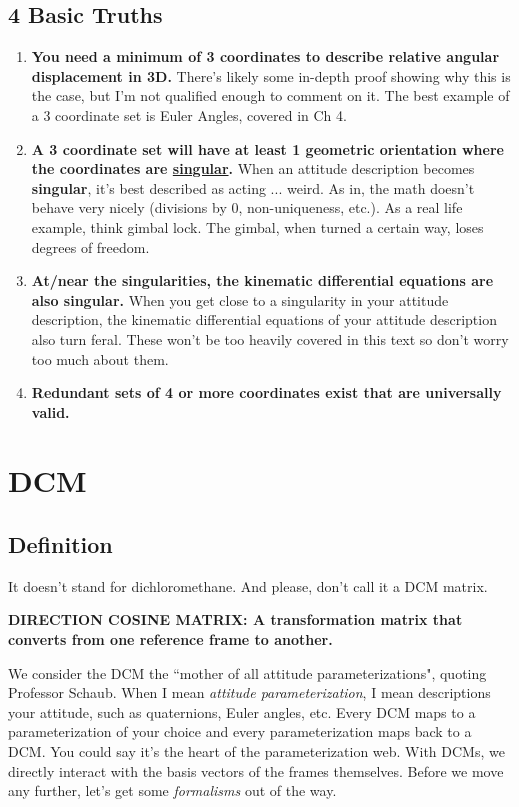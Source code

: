 \documentclass[a4paper,14pt]{extreport}
\begin{document}
\section{4 Basic Truths}
\begin{enumerate}
\item \textbf{You need a minimum of 3 coordinates to describe relative angular displacement in 3D.} There's likely some in-depth proof showing why this is the case, but I'm not qualified enough to comment on it. The best example of a 3 coordinate set is Euler Angles, covered in Ch 4.

\item \textbf{A 3 coordinate set will have at least 1 geometric orientation where the coordinates are \underline{singular}.} When an attitude description becomes \textbf{singular}, it's best described as acting ... weird. As in, the math doesn't behave very nicely (divisions by 0, non-uniqueness, etc.). As a real life example, think gimbal lock. The gimbal, when turned a certain way, loses degrees of freedom.

\item \textbf{At/near the singularities, the kinematic differential equations are also singular.} When you get close to a singularity in your attitude description, the kinematic differential equations of your attitude description also turn feral. These won't be too heavily covered in this text so don't worry too much about them.

\item \textbf{Redundant sets of 4 or more coordinates exist that are universally valid.}

\end{enumerate}
\chapter{DCM}
\section{Definition}
It doesn't stand for dichloromethane. And please, don't call it a DCM matrix.

\begin{center}
\textbf{DIRECTION COSINE MATRIX: A transformation matrix that converts from one reference frame to another.}
\end{center}

We consider the DCM the ``mother of all attitude parameterizations", quoting Professor Schaub. When I mean \emph{attitude parameterization}, I mean descriptions your attitude, such as quaternions, Euler angles, etc. Every DCM maps to a parameterization of your choice and every parameterization maps back to a DCM. You could say it's the heart of the parameterization web. With DCMs, we directly interact with the basis vectors of the frames themselves. Before we move any further, let's get some \emph{formalisms} out of the way.
\end{document}
